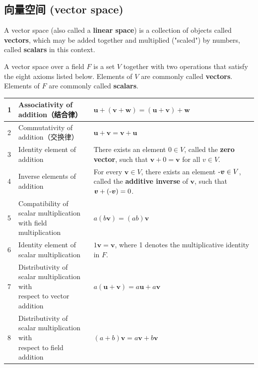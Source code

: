\subsection{向量空间 (vector space)}
\cite{_vector_????}
A vector space (also called a \textbf{linear space}) is a collection of objects called \textbf{vectors}, which may be added together and multiplied ("scaled") by numbers, called \textbf{scalars} in this context. \par
A vector space over a field $F$ is a set $V$ together with two operations that satisfy the eight axioms listed below. Elements of $V$ are commonly called \textbf{vectors}. Elements of $F$ are commonly called \textbf{scalars}. \par

\begin{tabular}[l]{|l|l|l|}
\hline
1 & Associativity of addition（结合律） & $\bm u + (\bm v + \bm w) = (\bm u + \bm v) + \bm w$ \\ \hline
2 & Commutativity of addition（交换律） & $\bm u + \bm v = \bm v + \bm u$ \\ \hline
3 & Identity element of addition & \makecell[l]{There exists an element $0 \in V$, \\ called the \textbf{zero vector}, \\such that $\bm v + 0 = \bm v$ for all $ v \in V$.} \\ \hline
4 & Inverse elements of addition & \makecell[l]{For every $ \bm v \in V$, \\there exists an element $ \textnormal{-} \bm v \in V$,\\ called the \textbf{additive inverse} of $ \bm v$, \\such that $\bm v + (\textnormal{-}\bm v) = 0$.} \\ \hline
5 & \makecell[l]{Compatibility of scalar multiplication \\ with field multiplication} & $a(b\bm v) = (ab)\bm v$ \\ \hline
6 & Identity element of scalar multiplication & \makecell[l]{ $1 \bm v = \bm v$, where 1 denotes \\the multiplicative identity in $F$.} \\ \hline
7 & \makecell[l]{Distributivity of scalar multiplication with \\ respect to vector addition} & $a(\bm u + \bm v) = a\bm u + a\bm v$ \\ \hline
8 & \makecell[l]{ Distributivity of scalar multiplication with \\ respect to field addition} & $(a + b)\bm v = a\bm v + b\bm v$ \\
\hline
\end{tabular}

